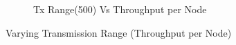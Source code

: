 \begin{figure}[h]
\begin{subfigure}{.5\textwidth}
         \caption{Tx Range(500) Vs Throughput per Node}
        \end{subfigure}
\caption{Varying Transmission Range (Throughput per Node)}
\label{tx_range_per_node_throughput}
\end{figure}

